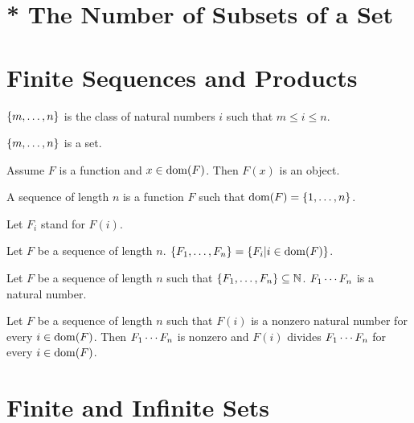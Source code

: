 \documentclass{article}
\begin{document}
\section{* The Number of Subsets of a Set}


\section{Finite Sequences and Products}

\begin{forthel}
\begin{definition}
$\{m,\dots,n\}$ is the class of
natural numbers $i$ such that $m \leq i \leq n$.
\end{definition}

\begin{axiom}
$\{m,\dots,n\}$ is a set.
\end{axiom}

\begin{axiom}
Assume $F$ is a function and $x \in \operatorname{dom}(F)$.
Then $F(x)$ is an object.
\end{axiom}

\begin{definition}
A sequence of length $n$ is a
function $F$ such that $\operatorname{dom}(F) = \{1,\dots,n\}$.
\end{definition}

Let $F_{i}$ stand for $F(i)$.

\begin{definition}
Let $F$ be a sequence of length $n$.
$\{F_{1},\dots,F_{n}\} = \{ F_{i} | i \in \operatorname{dom}(F)\}$.
\end{definition}

\begin{signature}
Let $F$ be a sequence of length $n$
such that $\{F_{1},\dots,F_{n}\} \subseteq \mathbb{N}$.
$F_{1} \cdots F_{n}$ is a natural number.
\end{signature}

\begin{axiom}[Factorproperty]
Let $F$ be a sequence of length $n$
such that $F(i)$ is a nonzero natural number for every $i \in \operatorname{dom}(F)$.
Then $F_{1} \cdots F_{n}$ is nonzero and
$F(i)$ divides $F_{1} \cdots F_{n}$ for every $i \in \operatorname{dom}(F)$.
\end{axiom}

\end{forthel}


\section{Finite and Infinite Sets}
\end{document}
